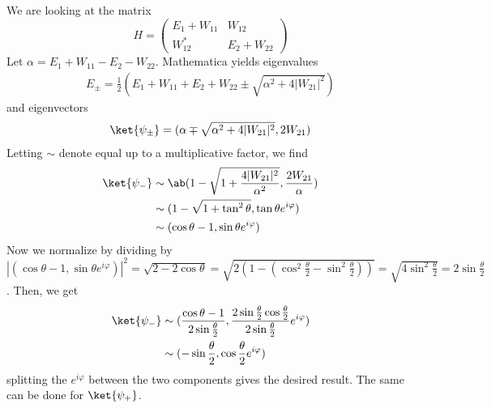 \documentclass[12pt]{article}
\begin{document}
\begin{ans}
    We are looking at the matrix 
    \[H = \begin{pmatrix}
        E_1 + W_{11} & W_{12} \\ 
        W_{12}^* & E_2 + W_{22}
    \end{pmatrix}\]
    Let $\alpha = E_1 + W_{11} - E_2 - W_{22}$. Mathematica yields eigenvalues 
    \begin{align*}
        E_{\pm} = \frac12(E_1 + W_{11} + E_2 + W_{22} \pm \sqrt{\alpha^2 + 4|W_{21}|^2})
    \end{align*}
    and eigenvectors
    \begin{align*}
        \ket{\psi_\pm} &= (\alpha \mp \sqrt{\alpha^2 + 4|W_{21}|^2}, 2W_{21})\\ 
    \end{align*}
    Letting $\sim$ denote equal up to a multiplicative factor, we find 
    \begin{align*}
        \ket{\psi_-}&\sim \ab(1 - \sqrt{1 + \frac{4|W_{21}|^2}{\alpha^2}}, \frac{2W_{21}}{\alpha})\\
        & \sim (1 - \sqrt{1 + \tan^2\theta}, \tan \theta e^{i\varphi})\\ 
        & \sim (\cos \theta - 1, \sin \theta e^{i\varphi})
    \end{align*}
    Now we normalize by dividing by $|(\cos \theta - 1, \sin \theta e^{i\varphi})|^2 = \sqrt{2 - 2\cos\theta} = \sqrt{2(1 - (\cos^2\frac\theta 2 - \sin^2\frac \theta 2))} = \sqrt{4\sin^2\frac\theta2} = 2\sin \frac \theta 2$. Then, we get 
    \begin{align*}
        \ket{\psi_-} &\sim (\frac{\cos\theta - 1}{2\sin \frac \theta 2}, \frac{2\sin \frac\theta 2 \cos \frac \theta 2}{2\sin \frac \theta 2} e^{i \varphi})\\
        &\sim (-\sin\frac \theta 2, \cos \frac\theta 2 e^{i \varphi})
    \end{align*}
    splitting the $e^{i\varphi}$ between the two components gives the desired result. The same can be done for $\ket{\psi_+}$.
\end{ans}
\end{document}
